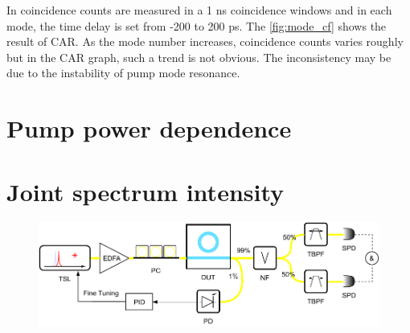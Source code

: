 In coincidence counts are measured in a 1 ns coincidence windows and in each mode, the time delay is set from -200 to 200 ps. The \autoref{fig:mode_cf} shows the result of CAR. As the mode number increases, coincidence counts varies roughly but in the CAR graph, such a trend is not obvious. The inconsistency may be due to the instability of pump mode resonance.


\begin{figure}
	\centering
	
	\label{fig:mode_cf}
\end{figure}




\section{Pump power dependence}


\begin{figure}
	\centering
	
	\mycaption{}{}
	\label{fig:pwflux}
\end{figure}

\begin{figure}
	\centering
	
	\mycaption{}{}
	\label{fig:pwcar}
\end{figure}



\section{Joint spectrum intensity}


\begin{figure}
	\centering
	\includegraphics[width=1\linewidth]{imgs/pid.pdf}
	\caption{}
	\label{fig:bibpf}
\end{figure}

\begin{figure}
	\centering
	
	\label{fig:flux1}
\end{figure}

\begin{figure}
	\centering
	
	\mycaption{}{}
	\label{fig:}
\end{figure}




